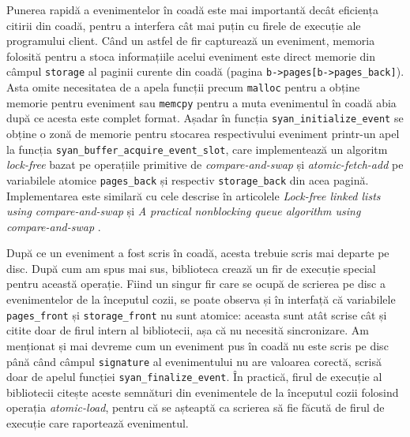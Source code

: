 Punerea rapidă a evenimentelor în coadă este mai importantă decât
eficiența citirii din coadă, pentru a interfera cât mai puțin cu firele
de execuție ale programului client. Când un astfel de fir capturează un
eveniment, memoria folosită pentru a stoca informațiile acelui eveniment
este direct memorie din câmpul \lstinline{storage} al paginii curente
din coadă (pagina \lstinline{b->pages[b->pages_back]}). Asta omite
necesitatea de a apela funcții precum \lstinline{malloc} pentru a obține
memorie pentru eveniment sau \lstinline{memcpy} pentru a muta
evenimentul în coadă abia după ce acesta este complet format. Așadar în
funcția \lstinline{syan_initialize_event} se obține o zonă de memorie
pentru stocarea respectivului eveniment printr-un apel la funcția
\lstinline{syan_buffer_acquire_event_slot}, care implementează un
algoritm \textit{lock-free} bazat pe operațiile primitive de
\textit{compare-and-swap} și \textit{atomic-fetch-add} pe variabilele
atomice \lstinline{pages_back} și respectiv \lstinline{storage_back} din
acea pagină. Implementarea este similară cu cele descrise în articolele
\textit{Lock-free linked lists using compare-and-swap}
\cite{LinkedListsCAS} și
\textit{A practical nonblocking queue algorithm using compare-and-swap}
\cite{QueueCAS}.

După ce un eveniment a fost scris în coadă, acesta trebuie scris mai
departe pe disc. După cum am spus mai sus, biblioteca crează un fir de
execuție special pentru această operație. Fiind un singur fir care se
ocupă de scrierea pe disc a evenimentelor de la începutul cozii, se
poate observa și în interfață că variabilele \lstinline{pages_front} și
\lstinline{storage_front} nu sunt atomice: aceasta sunt atât scrise cât
și citite doar de firul intern al bibliotecii, așa că nu necesită
sincronizare. Am menționat și mai devreme cum un eveniment pus în coadă
nu este scris pe disc până când câmpul \lstinline{signature} al
evenimentului nu are valoarea corectă, scrisă doar de apelul funcției
\lstinline{syan_finalize_event}. În practică, firul de execuție al
bibliotecii citește aceste semnături din evenimentele de la începutul
cozii folosind operația \textit{atomic-load}, pentru că se așteaptă ca
scrierea să fie făcută de firul de execuție care raportează evenimentul.

